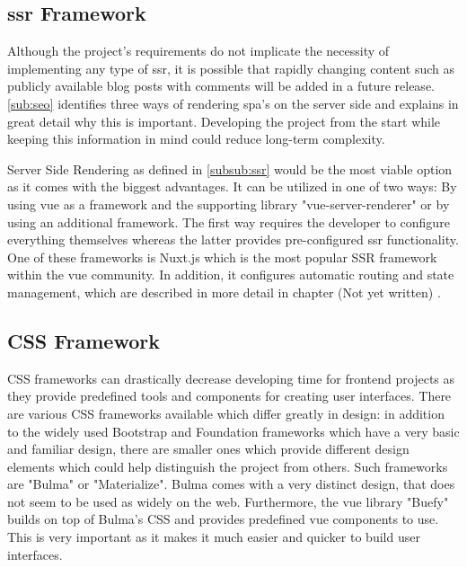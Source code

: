 \subsection{\acrshort{ssr} Framework}
Although the project's requirements do not implicate the necessity of implementing any type of \acrfull{ssr}, it is possible that rapidly changing content such as publicly available blog posts with comments will be added in a future release. \autoref{sub:seo} identifies three ways of rendering \acrshort{spa}'s on the server side and explains in great detail why this is important. Developing the project from the start while keeping this information in mind could reduce long-term complexity. 

Server Side Rendering as defined in \autoref{subsub:ssr} would be the most viable option as it comes with the biggest advantages. It can be utilized in one of two ways: By using vue as a framework and the supporting library "vue-server-renderer" or by using an additional framework. The first way requires the developer to configure everything themselves whereas the latter provides pre-configured \acrshort{ssr} functionality. One of these frameworks is Nuxt.js which is the most  popular SSR framework within the vue community. In addition, it configures automatic routing and state management, which are described in more detail in chapter (Not yet written) . 

\subsection{CSS Framework}
CSS frameworks can drastically decrease developing time for frontend projects as they provide predefined tools and components for creating user interfaces. There are various CSS frameworks available which differ greatly in design: in addition to the widely used Bootstrap and Foundation frameworks which have a very basic and familiar design, there are smaller ones which provide different design elements which could help distinguish the project from others. Such frameworks are "Bulma" or "Materialize". Bulma comes with a very distinct design, that does not seem to be used as widely on the web. Furthermore, the vue library "Buefy" builds on top of Bulma's CSS and provides predefined vue components to use. This is very important as it makes it much easier and quicker to build user interfaces.

